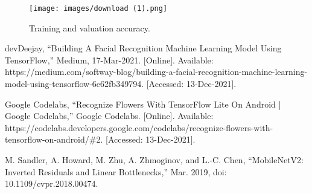 \documentclass[12pt]{article}
\begin{document}
\begin{figure}[ht]
    \begin{center}
        \texttt{[image: images/download (1).png]}
    \end{center}
    \caption{Training and valuation accuracy.}
    \label{res}
\end{figure}


\begin{thebibliography}{999}
    devDeejay, “Building A Facial Recognition Machine Learning Model Using TensorFlow,” Medium, 17-Mar-2021. [Online]. Available: https://medium.com/softway-blog/building-a-facial-recognition-machine-learning-model-using-tensorflow-6e62fb349794. [Accessed: 13-Dec-2021].

    Google Codelabs, “Recognize Flowers With TensorFlow Lite On Android | Google Codelabs,” Google Codelabs. [Online]. Available: https://codelabs.developers.google.com/codelabs/recognize-flowers-with-tensorflow-on-android/\#2. [Accessed: 13-Dec-2021].
  
    M. Sandler, A. Howard, M. Zhu, A. Zhmoginov, and L.-C. Chen, “MobileNetV2: Inverted       Residuals and Linear Bottlenecks,” Mar. 2019, doi: 10.1109/cvpr.2018.00474.

\end{thebibliography}
\end{document}
